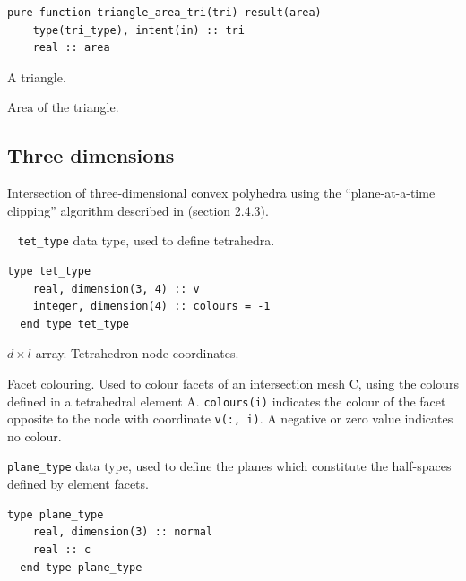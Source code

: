 \documentclass{article}
\begin{document}
\begin{lstlisting}[language=FORTRAN]
  pure function triangle_area_tri(tri) result(area)
    type(tri_type), intent(in) :: tri
    real :: area
\end{lstlisting}

\begin{description}[font=\ttfamily\bfseries,leftmargin=2.2\parindent,labelindent=1.7\parindent,noitemsep]
  \item[tri] A triangle.
  \item[area] Area of the triangle.
\end{description}

\subsection{Three dimensions}\label{sect:3D_intersection}

Intersection of three-dimensional convex polyhedra using the ``plane-at-a-time
clipping'' algorithm described in \citet{eberly2007} (section 2.4.3).

~\newline
\verb+tet_type+ data type, used to define tetrahedra.

\begin{lstlisting}[language=FORTRAN]
  type tet_type
    real, dimension(3, 4) :: v
    integer, dimension(4) :: colours = -1
  end type tet_type
\end{lstlisting}

\begin{description}[font=\ttfamily\bfseries,leftmargin=2.2\parindent,labelindent=1.7\parindent,noitemsep]
  \item[v] $d \times l$ array. Tetrahedron node coordinates.
  \item[colours] Facet colouring. Used to colour facets of an intersection mesh
    C, using the colours defined in a tetrahedral element A. \verb+colours(i)+
    indicates the colour of the facet opposite to the node with coordinate
    \verb+v(:, i)+. A negative or zero value indicates no colour.
\end{description}

\noindent \verb+plane_type+ data type, used to define the planes which
constitute the half-spaces defined by element facets.

\begin{lstlisting}[language=FORTRAN]
  type plane_type
    real, dimension(3) :: normal
    real :: c
  end type plane_type
\end{lstlisting}
\end{document}
